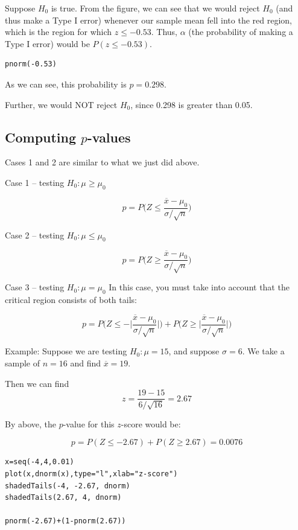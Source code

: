 \documentclass[11pt]{article}
\begin{document}
Suppose $H_0$ is true.  From the figure, we can see that we would reject $H_0$ (and thus make a Type I error) whenever our sample mean fell into the red region, which is the region for which $z\leq -0.53$.  Thus, $\alpha$ (the probability of making a Type I error) would be $P(z\leq -0.53)$.  

\begin{verbatim}
pnorm(-0.53)
\end{verbatim}

As we can see, this probability is $p=0.298$.  

Further, we would NOT reject $H_0$, since 0.298 is greater than 0.05.

\subsection*{Computing $p$-values}
\label{sec-2-1}

Cases 1 and 2 are similar to what we just did above.

Case 1 -- testing $H_0:\mu\geq \mu_0$

\[
p=P\Biggl(Z\leq \frac{\overline{x}-\mu_0}{\sigma/\sqrt{n}}\Biggr)
\]

Case 2 -- testing $H_0:\mu\leq \mu_0$

\[
p=P\Biggl(Z\geq \frac{\overline{x}-\mu_0}{\sigma/\sqrt{n}}\Biggr)
\]


Case 3 -- testing $H_0:\mu=\mu_0$
In this case, you must take into account that the critical region consists of both tails:

\[
p=P\Biggl(Z\leq -\Biggl|\frac{\overline{x}-\mu_0}{\sigma/\sqrt{n}}\Biggr|\Biggr) + P\Biggl(Z\geq \Biggl|\frac{\overline{x}-\mu_0}{\sigma/\sqrt{n}}\Biggr|\Biggr)
\]

Example:  Suppose we are testing $H_0:\mu=15$, and suppose $\sigma=6$.  We take a sample of $n=16$ and find $\overline{x}=19$.  

Then we can find
\[
z=\frac{19-15}{6/\sqrt{16}} = 2.67
\]

By above, the $p$-value for this $z$-score would be:

\[
p=P(Z\leq -2.67)+P(Z\geq 2.67)=0.0076
\]

\begin{verbatim}
x=seq(-4,4,0.01)
plot(x,dnorm(x),type="l",xlab="z-score")
shadedTails(-4, -2.67, dnorm)
shadedTails(2.67, 4, dnorm)

pnorm(-2.67)+(1-pnorm(2.67))
\end{verbatim}
\end{document}
